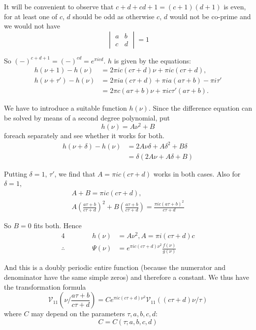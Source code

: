 It will be convenient to observe that $c+d+cd+1= (c+1)(d+1)$ is even,
for at least one of $c$, $d$ should be odd as otherwise $c$, $d$ would
not be co-prime and we would not have 
$$
\begin{vmatrix} 
  a & b\\ 
  c & d 
\end{vmatrix} =1
$$

So $(-)^{c+d+1} = (-)^{cd} = e^{\pi i cd}$. $h$ is given by the
equations:
\begin{align*}
  h(\nu+1)- h(\nu) & = 2 \pi i c(c \tau + d) \nu + \pi i c (c \tau
  +d),\\
  h(\nu+ \tau') - h(\nu) & = 2 \pi i a (c\tau +d) + \pi i a(a \tau +b)
  - \pi i \tau'\\
  & = 2 \pi c (a \tau +b) \nu + \pi i c \tau' (a \tau +b).
\end{align*}

We have to introduce a suitable function $h(\nu)$. Since the
difference equation can be solved by means of a second degree
polynomial, put
$$
h(\nu)= A \nu^2 + B
$$
for\pageoriginale each separately and see whether it works for both.
\begin{align*}
  h(\nu+\delta) - h(\nu)& = 2 A \nu \delta  + A \delta^2 + B \delta\\
  & = \delta (2 A \nu + A \delta + B)
\end{align*}

Putting $\delta= 1$, $\tau'$, we find that $A= \pi i c (c \tau +d)$
works in both cases. Also for $\delta=1$,
\begin{gather*}
A+B = \pi i c(c\tau +d),\\
A\left( \frac{a \tau+b}{c\tau+d}\right)^2 + B \left(\frac{a \tau +b}{c
  \tau+d}\right)  = \frac{\pi i c (a \tau +b)^2}{c\tau +d}
\end{gather*}

So $B=0$ fits both. Hence
\begin{alignat*}{4}
  &\hspace{1cm}& h(\nu) & = A \nu^2, A = \pi i (c \tau +d) c\\
  \therefore && \Psi (\nu) & = e^{\pi i c (c \tau +d) \nu^2} \frac{f(\nu)}{g(\nu)}
\end{alignat*}

And this is a doubly periodic entire function (because the numerator
and denominator have the same simple zeros) and therefore a
constant. We thus have the transformation formula
$$
\mathscr{V}_{11} \left(\nu \Big/ \frac{a \tau+b}{c\tau+d}\right) =
C e^{\pi i c (c \tau +d)\nu^2} \mathscr{V}_{11}((c \tau+d)\nu/\tau)
$$
where $C$ may depend on the parameters $\tau, a, b, c, d$:
$$
C= C(\tau; a, b, c, d)
$$

